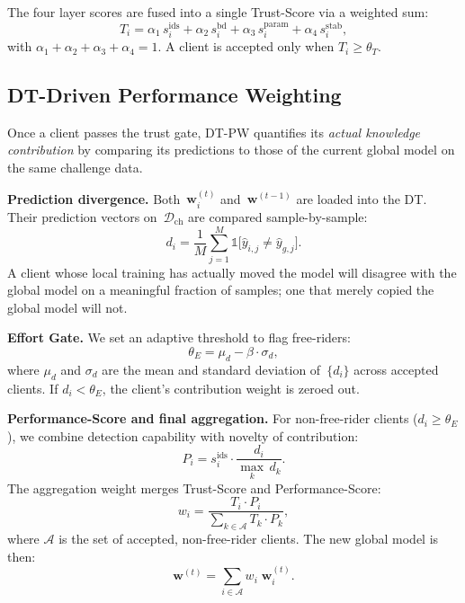\documentclass[conference]{IEEEtran}
\begin{document}
    The four layer scores are fused into a single Trust-Score via a weighted sum:
    \begin{equation}
        T_i = \alpha_1\, s_i^{\text{ids}} + \alpha_2\, s_i^{\text{bd}} + \alpha_3\, s_i^{\text{param}} + \alpha_4\, s_i^{\text{stab}},
    \label{eq:trust}
    \end{equation}
    with $\alpha_1{+}\alpha_2{+}\alpha_3{+}\alpha_4 = 1$. A client is accepted only when $T_i \ge \theta_T$.
    
    \subsection{DT-Driven Performance Weighting}\label{sec:dtpw}
    
    Once a client passes the trust gate, DT-PW quantifies its \emph{actual knowledge contribution} by comparing its predictions to those of the current global model on the same challenge data.
    
    \textbf{Prediction divergence.} Both~$\mathbf{w}_i^{(t)}$ and~$\mathbf{w}^{(t-1)}$ are loaded into the DT. Their prediction vectors on~$\mathcal{D}_{\text{ch}}$ are compared sample-by-sample:
    \begin{equation}
        d_i = \frac{1}{M}\sum_{j=1}^{M} \mathbb{1}\!\bigl[\hat{y}_{i,j} \neq \hat{y}_{g,j}\bigr].
    \label{eq:divergence}
    \end{equation}
    A client whose local training has actually moved the model will disagree with the global model on a meaningful fraction of samples; one that merely copied the global model will not.
    
    \textbf{Effort Gate.} We set an adaptive threshold to flag free-riders:
    \begin{equation}
        \theta_E = \mu_d - \beta \cdot \sigma_d,
    \label{eq:effort}
    \end{equation}
    where $\mu_d$ and $\sigma_d$ are the mean and standard deviation of~$\{d_i\}$ across accepted clients. If $d_i < \theta_E$, the client's contribution weight is zeroed out.
    
    \textbf{Performance-Score and final aggregation.} For non-free-rider clients ($d_i \ge \theta_E$), we combine detection capability with novelty of contribution:
    \begin{equation}
        P_i = s_i^{\text{ids}} \cdot \frac{d_i}{\max_k\, d_k}.
    \label{eq:performance}
    \end{equation}
    The aggregation weight merges Trust-Score and Performance-Score:
    \begin{equation}
        w_i = \frac{T_i \cdot P_i}{\sum_{k \in \mathcal{A}} T_k \cdot P_k},
    \label{eq:weight}
    \end{equation}
    where $\mathcal{A}$ is the set of accepted, non-free-rider clients. The new global model is then:
    \begin{equation}
        \mathbf{w}^{(t)} = \sum_{i \in \mathcal{A}} w_i \;\mathbf{w}_i^{(t)}.
    \label{eq:aggregation}
    \end{equation}
    
\end{document}

